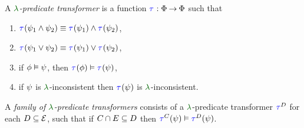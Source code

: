 \begin{scope}
  \noindent
  \begin{definition}
    \label{def:trans}
    A \emph{$\labeling$-predicate transformer} is a function
    $\aTr{}{}:\Formulae\fun\Formulae$ such that
    \begin{enumerate}[,label=(\textsc{x}\arabic*),ref=\textsc{x}\arabic*]
    \item \label{tr-and}
      $\aTr{}{\bForm_1\land\bForm_2}\riff\aTr{}{\bForm_1}\land\aTr{}{\bForm_2}$,    
    \item \label{tr-or}
      $\aTr{}{\bForm_1\lor\bForm_2}\riff\aTr{}{\bForm_1}\lor\aTr{}{\bForm_2}$,
    \item \label{tr-implies}
      if $\phi \mathrel{\vDash} \psi$, then $\aTr{}{\aForm} \rimplies
      \aTr{}{\bForm}$,
    \item \label{tr-false}
      if $\psi$ is $\labeling$-inconsistent then $\aTr{}{\bForm}$ is $\labeling$-inconsistent.
    \end{enumerate}
  \end{definition}
  \medskip

  \noindent
  \begin{definition}
    \label{def:family}
    A \emph{family of $\labeling$-predicate transformers} consists
    of a $\labeling$-predicate transformer $\aTr{\bEvs}{}$ for each
    $D\subseteq\mathcal{E}$, such that if $C \cap E \subseteq D$
    then $\aTr{\cEvs}{\bForm} \rimplies \aTr{\bEvs}{\bForm}$.
  \end{definition}
  \medskip


\end{scope}
